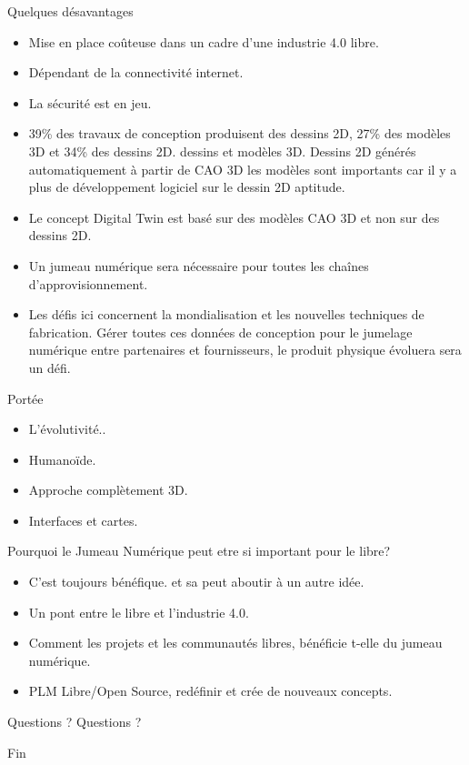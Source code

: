 \documentclass{beamer}
\begin{document}
 \begin{frame}{Quelques désavantages}
  \begin{itemize}
	  \item Mise en place coûteuse dans un cadre d'une industrie 4.0 libre.
	  \item Dépendant de la connectivité internet.
	  \item La sécurité est en jeu.
      \item 39\% des travaux de conception produisent des dessins 2D, 27\% des modèles 3D et 34\% des dessins 
      2D. dessins et modèles 3D. Dessins 2D générés automatiquement à partir de CAO 3D les modèles sont 
      importants car il y a plus de développement logiciel sur le dessin 2D aptitude.
	 \item Le concept Digital Twin est basé sur des modèles CAO 3D et non sur des dessins 2D.
     \item Un jumeau numérique sera nécessaire pour toutes les chaînes d'approvisionnement.
     \item Les défis ici concernent la mondialisation et les nouvelles techniques de fabrication. Gérer toutes 
     ces données de conception pour le jumelage numérique entre partenaires et fournisseurs, le produit physique 
     évoluera sera un défi.
  \end{itemize}
 \end{frame}
 \begin{frame}{Portée}
  \begin{itemize}
      \item L'évolutivité..
      \item Humanoïde.
      \item Approche complètement 3D.
	  \item Interfaces et cartes.
  \end{itemize}
 \end{frame}
 \begin{frame}{Pourquoi le Jumeau Numérique peut etre si important pour le libre?}
  \begin{itemize}
	\item C'est toujours bénéfique. et sa peut aboutir à un autre idée. 	
	\item Un pont entre le libre et l'industrie 4.0.
	\item Comment les projets et les communautés libres, bénéficie t-elle du jumeau numérique.
	\item PLM Libre/Open Source, redéfinir et crée de nouveaux concepts.
  \end{itemize}
 \end{frame}
 \begin{frame}{Questions ?}
 Questions ?
  \end{frame}
 \begin{frame}{Fin}
 \end{frame}
\end{document}
